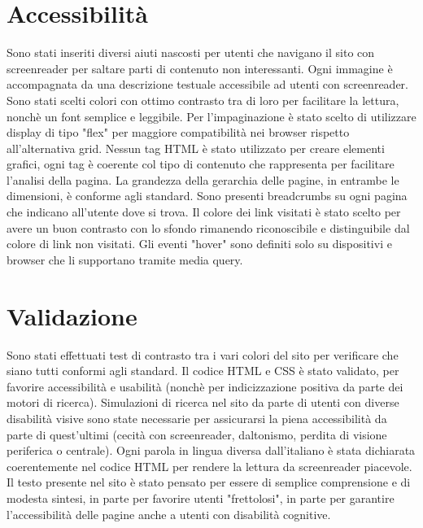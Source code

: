 \documentclass[a4paper, 12pt]{article}
\begin{document}
\section{Accessibilità}
Sono stati inseriti diversi aiuti nascosti per utenti che navigano il sito con screenreader per saltare parti di contenuto non interessanti.
Ogni immagine è accompagnata da una descrizione testuale accessibile ad utenti con screenreader.
Sono stati scelti colori con ottimo contrasto tra di loro per facilitare la lettura, nonchè un font semplice e leggibile.
Per l'impaginazione è stato scelto di utilizzare display di tipo "flex" per maggiore compatibilità nei browser rispetto all'alternativa grid.
Nessun tag HTML è stato utilizzato per creare elementi grafici, ogni tag è coerente col tipo di contenuto che rappresenta per facilitare l'analisi della pagina.
La grandezza della gerarchia delle pagine, in entrambe le dimensioni, è conforme agli standard.
Sono presenti breadcrumbs su ogni pagina che indicano all'utente dove si trova.
Il colore dei link visitati è stato scelto per avere un buon contrasto con lo sfondo rimanendo riconoscibile e distinguibile dal colore di link non visitati.
Gli eventi "hover" sono definiti solo su dispositivi e browser che li supportano tramite media query.

\section{Validazione}
Sono stati effettuati test di contrasto tra i vari colori del sito per verificare che siano tutti conformi agli standard.
Il codice HTML e CSS è stato validato, per favorire accessibilità e usabilità (nonchè per indicizzazione positiva da parte dei motori di ricerca).
Simulazioni di ricerca nel sito da parte di utenti con diverse disabilità visive sono state necessarie per assicurarsi la piena accessibilità da parte di quest'ultimi (cecità con screenreader, daltonismo, perdita di visione periferica o centrale).
Ogni parola in lingua diversa dall'italiano è stata dichiarata coerentemente nel codice HTML per rendere la lettura da screenreader piacevole.
Il testo presente nel sito è stato pensato per essere di semplice comprensione e di modesta sintesi, in parte per favorire utenti "frettolosi", in parte per garantire l'accessibilità delle pagine anche
a utenti con disabilità cognitive.
\end{document}
